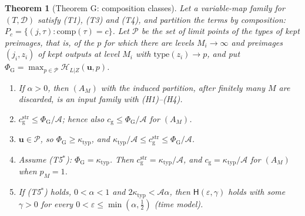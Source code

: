 \documentclass[11pt]{article}
\newtheorem{theorem}{Theorem}[section]
\theoremstyle{definition}
\theoremstyle{remark}
\providecommand{\eps}{\varepsilon}
\newcommand{\Hyp}{\mathsf{H}}                 %
\newcommand{\cg}{c_{\mathrm g}}               %
\newcommand{\Hcond}[1]{\textup{(H#1)}}        %
\newcommand{\Tcond}[1]{\textup{(T#1)}}        %
\newcommand{\Acs}{\mathcal A}                %
\newcommand{\ktyp}{\kappa_{\mathrm{typ}}}    %
\newcommand{\Hlz}{\mathcal H_{L|Z}}          %
\newcommand{\unif}{\mathbf u}                %
\newcommand{\PhiG}{\Phi_{\mathrm G}}         %
\newcommand{\cmpn}{\mathrm{comp}}            %
\newcommand{\typ}{\mathrm{type}}             %
\begin{document}
\begin{theorem}[Theorem G: composition classes]\label{cp:C9}
Let a variable-map family for $(T,\mathcal D)$ satisfy \Tcond1, \Tcond3{} and \Tcond4, and partition the terms by composition: $P_c=\{(j,\tau):\cmpn(\tau)=c\}$. Let $\mathcal P$ be the set of limit points of the types of kept preimages, that is, of the $p$ for which there are levels $M_i\to\infty$ and preimages $(j_i,z_i)$ of kept outputs at level $M_i$ with $\typ(z_i)\to p$, and put $\PhiG=\max_{p\in\mathcal P}\Hlz(\unif,p)$.
\begin{enumerate}[label=(\alph*)]
\item If $\alpha>0$, then $(A_M)$ with the induced partition, after finitely many $M$ are discarded, is an input family with \Hcond1--\Hcond4.
\item $\cg^{\mathrm{str}}\le\PhiG/\Acs$; hence also $\cg\le\PhiG/\Acs$ for $(A_M)$.
\item $\unif\in\mathcal P$, so $\PhiG\ge\ktyp$, and $\ktyp/\Acs\le\cg^{\mathrm{str}}\le\PhiG/\Acs$.
\item Assume \Tcond{5$^*$}: $\PhiG=\ktyp$. Then $\cg^{\mathrm{str}}=\ktyp/\Acs$, and $\cg=\ktyp/\Acs$ for $(A_M)$ when $p_M=1$.
\item If \Tcond{5$^*$} holds, $0<\alpha<1$ and $2\ktyp<\Acs\alpha$, then $\Hyp(\eps,\gamma)$ holds with some $\gamma>0$ for every $0<\eps\le\min(\alpha,\frac12)$ (time model).
\end{enumerate}
\end{theorem}
\end{document}
